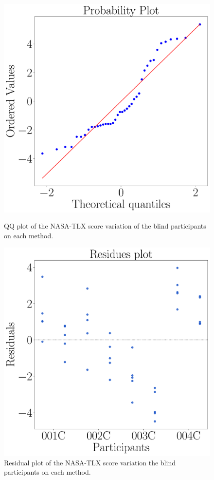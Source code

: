 \begin{figure}[!htb]
    \centering
    \begin{minipage}{0.45\textwidth}
        \centering
        \includegraphics[width = 0.8\linewidth]{Resultados/Nasa/Figuras/pdf/qqplot_nasa_avg_two_way_blind.pdf}
        \caption{QQ plot of the NASA-TLX score variation of the blind participants on each method.}
        \label{fig:qqplot_nasa_avg_two_way_blind}
    \end{minipage}
    \begin{minipage}{0.075\textwidth}
        \hfill
    \end{minipage}
    \begin{minipage}{0.45\textwidth}
        \centering
        \includegraphics[width = 0.8\linewidth]{Resultados/Nasa/Figuras/pdf/residplot_nasa_avg_two_way_blind.pdf}
        \caption{Residual plot of the NASA-TLX score variation the blind participants on each method.}
        \label{fig:residplot_nasa_avg_two_way_blind}
    \end{minipage}
\end{figure}

